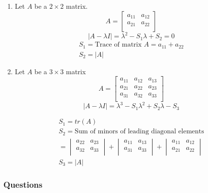 \documentclass[english,course,fleqn]{lecture}
\begin{document}
\begin{enumerate}
  \item Let $A$ be a $2 \times 2$ matrix.
    \[
      A = \begin{bmatrix}
        a_{11} & a_{12} \\
        a_{21} & a_{22} \\
      \end{bmatrix}
    \]
    \[
      | A - \lambda I| = \lambda^{2} - S_{1}\lambda + S_{2} = 0
    \]
    \begin{gather*}
      S_{1} =  \text{Trace of matrix } A = a_{11} + a_{22}\\
      S_{2} = |A|
    \end{gather*}

  \item Let $A$ be a $3 \times 3$ matrix
    \[
      A = \begin{bmatrix}
        a_{11} & a_{12} & a_{13} \\
        a_{21} & a_{22} & a_{23} \\
        a_{31} & a_{32} & a_{33} \\
      \end{bmatrix}
    \]
    \[
      |A - \lambda I| = \lambda^{3} - S_{1}\lambda^{2} + S_{2} \lambda - S_{3}
    \]

    \begin{gather*}
      S_{1} = tr(A)\\
      S_{2} = \text{Sum of minors of leading diagonal elements}\\
      = \begin{vmatrix}
        a_{22} & a_{23} \\
        a_{32} & a_{33} \\
        \end{vmatrix} + \begin{vmatrix}
        a_{11} & a_{13} \\
        a_{31} & a_{33} \\
        \end{vmatrix} + \begin{vmatrix}
        a_{11} & a_{12} \\
        a_{21} & a_{22} \\
      \end{vmatrix}\\
      S_{3} = |A|
    \end{gather*}
\end{enumerate}

\subsubsection{Questions}
\end{document}
